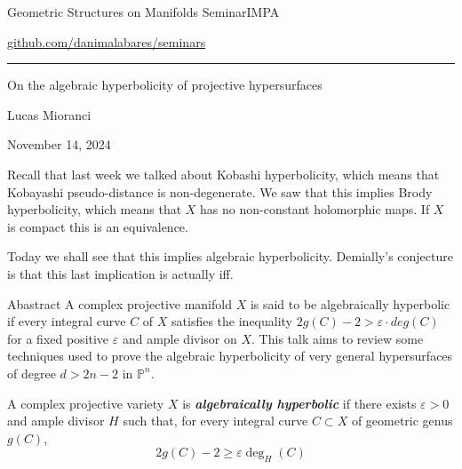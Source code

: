 


\begin{minipage}{\textwidth}
	\begin{minipage}{1\textwidth}
		Geometric Structures on Manifolds Seminar\hfill IMPA
		
		{\small\hfill\href{https://github.com/danimalabares/seminars}{github.com/danimalabares/seminars}}
		
	\end{minipage}
\end{minipage}\vspace{.2cm}\hrule

\vspace{10pt}

{\Huge On the algebraic hyperbolicity of projective hypersurfaces}

\hfill{\Large Lucas Mioranci}

\hfill{\large November 14, 2024}

\begin{upshot}\leavevmode
	Recall that last week we talked about Kobashi hyperbolicity, which means that Kobayashi pseudo-distance is non-degenerate. We saw that this implies Brody hyperbolicity, which means that $X$ has no non-constant holomorphic maps. If $X$ is compact this is an equivalence.

Today we shall see that this implies algebraic hyperbolicity. Demially's conjecture is that this last implication is actually iff.
\end{upshot}

\begin{thing4}{Abastract}\leavevmode
A complex projective manifold $X$ is said to be algebraically hyperbolic if every integral curve $C$ of $X$ satisfies the inequality $2g(C)-2>\varepsilon \cdot deg(C)$
 for a fixed positive $\varepsilon$ and ample divisor on $X$. This talk aims to review some techniques used to prove the algebraic hyperbolicity of very general hypersurfaces of degree $d>2n−2$ in $\mathbb{P}^n$.	
\end{thing4}

\begin{defn}\leavevmode
	A complex projective variety $X$ is \textit{\textbf{algebraically hyperbolic}} if there exists $\varepsilon>0$ and ample divisor $H$ such that, for every integral curve $C \subset X$ of geometric genus $g(C)$,
	\[2g(C)-2 \geq \varepsilon \operatorname{deg}_H(C)\]
\end{defn}

